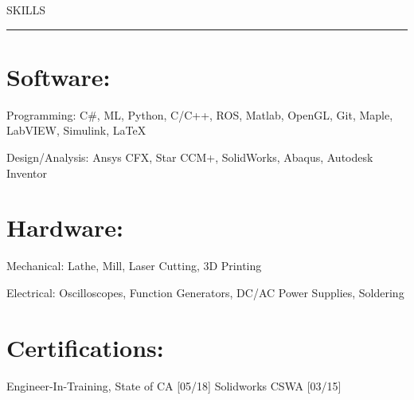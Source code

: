 \documentclass[letterpaper,10pt,oneside]{article}
\begin{document}
\begin{body}

{
\hspace{-1.72in}\noindent\color{cblue}
{SKILLS} %
}

\vspace{-1.6ex}
{\hspace{-1.73in}\noindent\color{dblue}\rule{6.935in}{0.4pt}} %
\vspace{-5.5ex}

\section
{Software:}{}

\vspace{-2.5ex}
\begin{detail}
Programming: C\#, ML, Python, C/C++, ROS, Matlab, OpenGL, Git, Maple, LabVIEW, Simulink, \LaTeX
\end{detail}

\begin{detail}
Design/Analysis: Ansys CFX, Star CCM+, SolidWorks, Abaqus, Autodesk Inventor
\end{detail}
\vspace{0.5ex}

\vspace{-1.5ex}
\section
{Hardware:}{}

\vspace{-2.5ex}
\begin{detail}
Mechanical: Lathe, Mill, Laser Cutting, 3D Printing
\end{detail}

\begin{detail}
Electrical: Oscilloscopes, Function Generators, DC/AC Power Supplies, Soldering
\end{detail}
\vspace{0.5ex}

\vspace{-2.5ex}
\section
{Certifications:}{}

\vspace{-2.0ex}
\begin{detail}
Engineer-In-Training, State of CA [05/18]  
\newline
Solidworks CSWA [03/15]
\end{detail}


\end{body}
\end{document}
